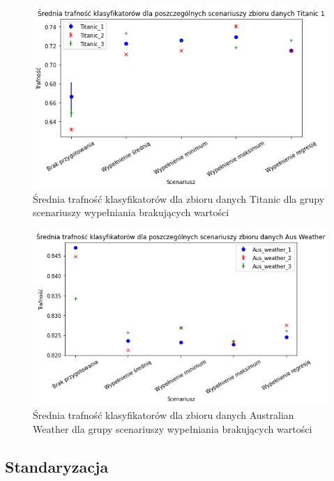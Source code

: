 \documentclass{book}
\begin{document}
\begin{figure}[H]
    \centerline{\includegraphics[scale=0.5]{Titanic_Avg_Wypełnienie_brakujących}}
    \centering
    \caption{Średnia trafność klasyfikatorów dla zbioru danych Titanic 
    dla grupy scenariuszy wypełniania brakujących wartości}
    \end{figure}

\begin{figure}[H]
    \centerline{\includegraphics[scale=0.5]{Aus_Weather_Avg_Wypełnienie_brakujących}}
    \centering
    \caption{Średnia trafność klasyfikatorów dla zbioru danych Australian Weather 
    dla grupy scenariuszy wypełniania brakujących wartości}
    \end{figure}

\subsection{Standaryzacja}
\end{document}
